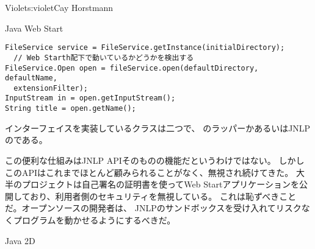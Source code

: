 \begin{aosachapter}{Violet}{s:violet}{Cay Horstmann}
\begin{aosasect1}{Java Web Start}
\begin{verbatim}
FileService service = FileService.getInstance(initialDirectory);
  // Web Starth配下で動いているかどうかを検出する
FileService.Open open = fileService.open(defaultDirectory, defaultName, 
  extensionFilter);
InputStream in = open.getInputStream();
String title = open.getName();
\end{verbatim}

\noindent
{}インターフェイスを実装しているクラスは二つで、
のラッパーかあるいはJNLPのである。

この便利な仕組みはJNLP APIそのものの機能だというわけではない。
しかしこのAPIはこれまでほとんど顧みられることがなく、無視され続けてきた。
大半のプロジェクトは自己署名の証明書を使ってWeb Startアプリケーションを公開しており、利用者側のセキュリティを無視している。
これは恥ずべきことだ。オープンソースの開発者は、
JNLPのサンドボックスを受け入れてリスクなくプログラムを動かせるようにするべきだ。

\end{aosasect1}

\begin{aosasect1}{Java 2D}


\end{aosasect1}
\end{aosachapter}
